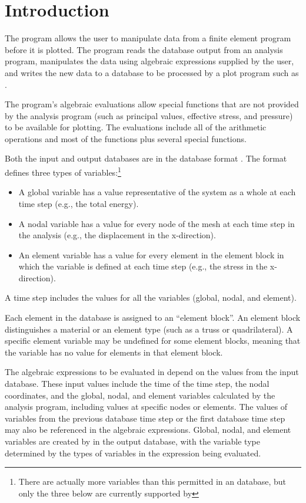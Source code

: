 \chapter{Introduction} \label{chap:intro}

The \caps{\PROGRAM} program allows the user to manipulate data from a
finite element program before it is plotted. The program reads the
database output from an analysis program, manipulates the data using
algebraic expressions supplied by the user, and writes the new data to a
database to be processed by a plot program such as 
\cite{bib:blot}.

The program's algebraic evaluations allow special functions that are not
provided by the analysis program (such as principal values, effective
stress, and pressure) to be available for plotting. The evaluations
include all of the  arithmetic operations and most of the
 functions plus several special functions.

Both the input and output databases are in the \exo{} database
format \cite{bib:exodus}. The \exo{} format defines three types of
variables:\footnote{There are actually more variables than this
  permitted in an \exo{} database, but only the three below are
  currently supported by \caps{\PROGRAM}}
\setlength{\itemsep}{\medskipamount} \begin{itemize}
\item
A global variable has a value representative of the system as a whole
at each time step (e.g., the total energy).
\item
A nodal variable has a value for every node of the mesh at each time
step in the analysis (e.g., the displacement in the x-direction).
\item
An element variable has a value for every element in the element block
in which the variable is defined at each time step (e.g., the stress in the
x-direction).

\end{itemize}

A time step includes the values for all the variables (global, nodal, and element).

Each element in the database is assigned to an ``element block''. An
element block distinguishes a material or an element type (such as a
truss or quadrilateral). A specific element variable may be undefined
for some element blocks, meaning that the variable has no value for
elements in that element block.

The algebraic expressions to be evaluated in \caps{\PROGRAM} depend on
the values from the input database. These input values include the time
of the time step, the nodal coordinates, and the global, nodal,
and element variables calculated by the analysis program, including
values at specific nodes or elements. The values of variables from the
previous database time step or the first database time step may also be
referenced in the algebraic expressions. Global, nodal, and
element variables are created by \caps{\PROGRAM} in the output database,
with the variable type determined by the types of variables in the
expression being evaluated.

